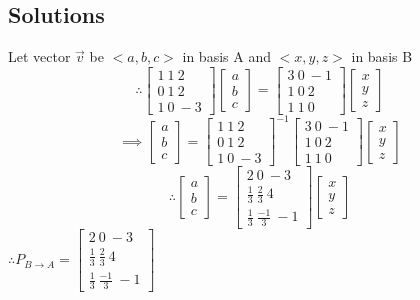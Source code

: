 \documentclass[14pt]{article}
\begin{document}
\subsection{Solutions}
Let vector $\vec{v}$ be $<a,b,c>$ in basis A and $<x,y,z>$ in basis B
\[\therefore
\begin{bmatrix}
	1 \ 1 \ 2 \\
	0 \ 1 \ 2 \\
	1 \ 0 \ -3
\end{bmatrix}
\begin{bmatrix}
	a \\ b \\ c
\end{bmatrix} = \begin{bmatrix}
3 \ 0 \ -1 \\
1 \ 0 \ 2 \\
1 \ 1 \ 0
\end{bmatrix}
\begin{bmatrix}
x \\ y \\ z
\end{bmatrix}
\]
\[\implies
\begin{bmatrix}
a \\ b \\ c
\end{bmatrix} = \begin{bmatrix}
1 \ 1 \ 2 \\
0 \ 1 \ 2 \\
1 \ 0 \ -3
\end{bmatrix}^{-1}
\begin{bmatrix}
3 \ 0 \ -1 \\
1 \ 0 \ 2 \\
1 \ 1 \ 0
\end{bmatrix}
\begin{bmatrix}
x \\ y \\ z
\end{bmatrix}
\]
\[\displaystyle \therefore
\begin{bmatrix}
a \\ b \\ c
\end{bmatrix} = 
\begin{bmatrix}
2 \ 0 \ -3 \\
\frac{1}{3} \ \frac{2}{3} \ 4 \\
\frac{1}{3} \ \frac{-1}{3} \ -1
\end{bmatrix}
\begin{bmatrix}
x \\ y \\ z
\end{bmatrix}
\]
$\therefore P_{B \rightarrow A} = \begin{bmatrix}
	2 \ 0 \ -3 \\
	\frac{1}{3} \ \frac{2}{3} \ 4 \\
	\frac{1}{3} \ \frac{-1}{3} \ -1
\end{bmatrix}
$
\end{document}
